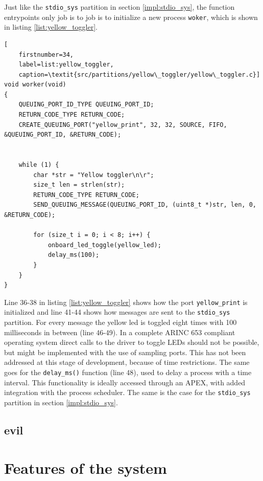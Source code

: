 Just like the \texttt{stdio\_sys} partition in section \ref{impl:stdio_sys}, the
function entrypoints only job is to job is to initialize a new process
\texttt{woker}, which is shown in listing \ref{list:yellow_toggler}.

\begin{minipage}{\linewidth}
\begin{lstlisting}[
	firstnumber=34,
	label=list:yellow_toggler,
	caption=\textit{src/partitions/yellow\_toggler/yellow\_toggler.c}]
void worker(void)
{
    QUEUING_PORT_ID_TYPE QUEUING_PORT_ID;
    RETURN_CODE_TYPE RETURN_CODE;
    CREATE_QUEUING_PORT("yellow_print", 32, 32, SOURCE, FIFO, &QUEUING_PORT_ID, &RETURN_CODE);


    while (1) {
        char *str = "Yellow toggler\n\r";
        size_t len = strlen(str);
        RETURN_CODE_TYPE RETURN_CODE;
        SEND_QUEUING_MESSAGE(QUEUING_PORT_ID, (uint8_t *)str, len, 0, &RETURN_CODE);

        for (size_t i = 0; i < 8; i++) {
            onboard_led_toggle(yellow_led);
            delay_ms(100);
        }
    }
}
\end{lstlisting}
\end{minipage}

Line 36-38 in listing \ref{list:yellow_toggler} shows how the port
\texttt{yellow\_print} is initialized and line 41-44 shows how messages are sent
to the \texttt{stdio\_sys} partition. For every message the yellow led is
toggled eight times with 100 milliseconds in between (line 46-49). In a complete
ARINC 653 compliant operating system direct calls to the driver to toggle LEDs
should not be possible, but might be implemented with the use of sampling ports.
This has not been addressed at this stage of development, because of time
restrictions. The same goes for the \texttt{delay\_ms()} function (line 48),
used to delay a process with a time interval. This functionality is ideally
accessed through an APEX, with added integration with the process scheduler.
The same is the case for the \texttt{stdio\_sys} partition in section
\ref{impl:stdio_sys}.

\subsection{evil}


\section{Features of the system}
